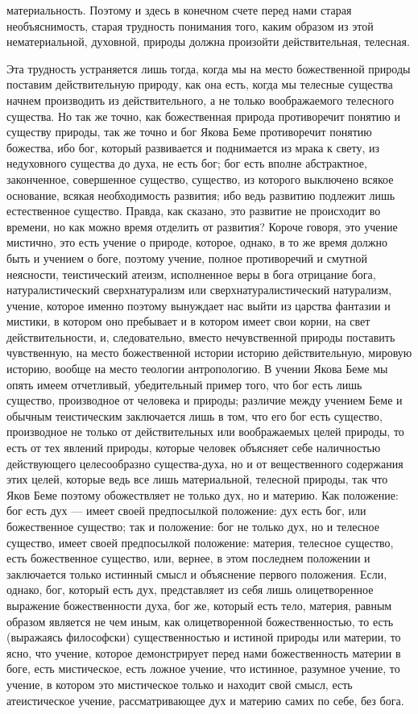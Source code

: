 \documentclass[12pt]{article}
\begin{document}
материальность. Поэтому и здесь в конечном счете перед нами старая необъяснимость, старая трудность понимания того, каким образом из этой нематериальной, духовной, природы должна произойти действительная, телесная. 

Эта трудность устраняется лишь тогда, когда мы на место божественной природы поставим действительную природу, как она есть, когда мы телесные существа начнем производить из действительного, а не только воображаемого телесного существа. Но так же точно, как божественная природа противоречит понятию и существу природы, так же точно и бог Якова Беме противоречит понятию божества, ибо бог, который развивается и поднимается из мрака к свету, из недуховного существа до духа, не есть бог; бог есть вполне абстрактное, законченное, совершенное существо, существо, из которого выключено всякое основание, всякая необходимость развития; ибо ведь развитию подлежит лишь естественное существо. Правда, как сказано, это развитие не происходит во времени, но как можно время отделить от развития? Короче говоря, это учение мистично, это есть учение о природе, которое, однако, в то же время должно быть и учением о боге, поэтому учение, полное противоречий и смутной неясности, теистический атеизм, исполненное веры в бога отрицание бога, натуралистический сверхнатурализм или сверхнатуралистический натурализм, учение, которое именно поэтому вынуждает нас выйти из царства фантазии и мистики, в котором оно пребывает и в котором имеет свои корни, на свет действительности, и, следовательно, вместо нечувственной природы поставить чувственную, на место божественной истории историю действительную, мировую историю, вообще на место теологии антропологию. В учении Якова Беме мы опять имеем отчетливый, убедительный пример того, что бог есть лишь существо, производное от человека и природы; различие между учением Беме и обычным теистическим заключается лишь в том, что его бог есть существо, производное не только от действительных или воображаемых целей природы, то есть от тех явлений природы, которые человек объясняет себе наличностью действующего целесообразно существа-духа, но и от вещественного содержания этих целей, которые ведь все лишь материальной, телесной природы, так что Яков Беме поэтому обожествляет не только дух, но и материю. Как положение: бог есть дух --- имеет своей предпосылкой положение: дух есть бог, или божественное существо; так и положение: бог не только дух, но и телесное существо, имеет своей предпосылкой положение: материя, телесное существо, есть божественное существо, или, вернее, в этом последнем положении и заключается только истинный смысл и объяснение первого положения. Если, однако, бог, который есть дух, представляет из себя лишь олицетворенное выражение божественности духа, бог же, который есть тело, материя, равным образом является не чем иным, как олицетворенной божественностью, то есть (выражаясь философски) существенностью и истиной природы или материи, то ясно, что учение, которое демонстрирует перед нами божественность материи в боге, есть мистическое, есть ложное учение, что истинное, разумное учение, то учение, в котором это мистическое только и находит свой смысл, есть атеистическое учение, рассматривающее дух и материю самих по себе, без бога. 
\end{document}
